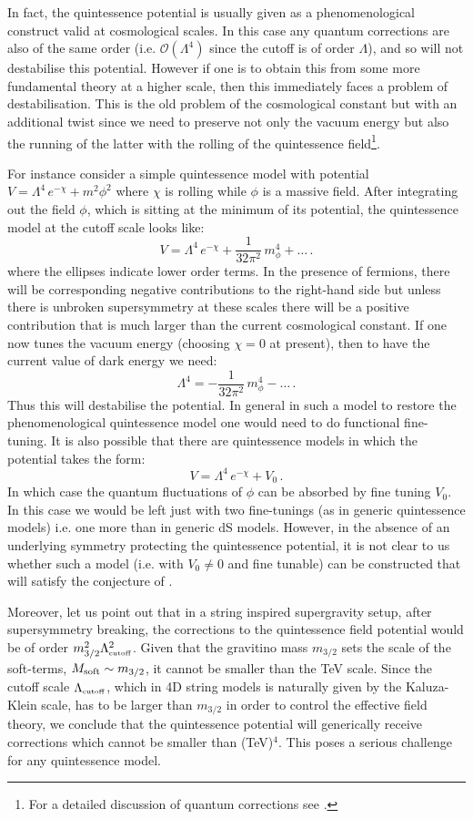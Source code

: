 \documentclass[11pt,a4paper]{article}
\newcommand{\be}{\begin{equation}}
\newcommand{\ee}{\end{equation}}
\newcommand{\mc}{\mathcal}
\def\cutoff{{\scriptscriptstyle {\rm cutoff}}}
\begin{document}
\begin{itemize}
In fact, the quintessence potential is usually given as a phenomenological construct valid at cosmological scales. In this case any quantum corrections
are also of the same order (i.e. $\mc{O}(\Lambda^4)$ since the cutoff is of order $\Lambda$), and so will not destabilise this potential. However if one is to obtain this from some more fundamental theory at a higher scale, then this immediately faces a problem of destabilisation. This is the old problem of the cosmological constant but with an additional twist since we need to preserve not only the vacuum energy but also the running of the latter with the rolling of the quintessence field\footnote{For a detailed discussion of quantum corrections see \cite{Garny:2006wc}.}.

For instance consider a simple quintessence model with potential $V= \Lambda^4\,e^{-\chi} + m^2 \phi^2$ where $\chi$ is rolling while $\phi$ is a massive field. After integrating out the field $\phi$, which is sitting at the minimum of its potential, the quintessence model at the cutoff scale looks like:
\be
V=\Lambda^4\, e^{- \chi}+\frac{1}{32\pi^2}\,m_\phi^4+\ldots\,.
\ee
where the ellipses indicate lower order terms. In the presence of fermions, there will be corresponding negative contributions to the right-hand side but unless there is unbroken supersymmetry at these scales there will be a positive contribution that is much larger than the current cosmological constant. If one now tunes the vacuum energy (choosing $\chi=0$ at present), then to have the current value of dark energy we need: 
\be
\Lambda^4 =-\frac{1}{32\pi^2}\,m_{\phi}^4-\ldots\,.
\ee
Thus this will destabilise the potential. In general in such a model to restore the phenomenological quintessence model one would need to do functional fine-tuning. It is also possible that there are quintessence models in which the potential takes the form: 
\be
V=\Lambda^4\, e^{- \chi}+V_0\,.
\ee
In which case the quantum fluctuations of $\phi$ can be absorbed by fine tuning $V_0$. In this case we would be left just with two fine-tunings (as in generic quintessence models) i.e. one more than in generic dS models. However, in the absence of an underlying symmetry protecting the quintessence potential, it is not clear to us whether such a model (i.e. with $V_0\ne 0$ and fine tunable) can be constructed that will satisfy the conjecture of \cite{Obied:2018sgi}.

Moreover, let us point out that in a string inspired supergravity setup, after supersymmetry breaking, the corrections to the quintessence field potential would be of order $m_{3/2}^2 \Lambda_\cutoff^2$. Given that the gravitino mass $m_{3/2}$ sets the scale of the soft-terms, $M_{\rm soft} \sim m_{3/2}$, it cannot be smaller than the TeV scale. Since the cutoff scale $\Lambda_\cutoff$, which in 4D string models is naturally given by the Kaluza-Klein scale, has to be larger than $m_{3/2}$ in order to control the effective field theory, we conclude that the quintessence potential will generically receive corrections which cannot be smaller than (TeV)$^4$. This poses a serious challenge for any quintessence model.


\end{itemize}
\end{document}
